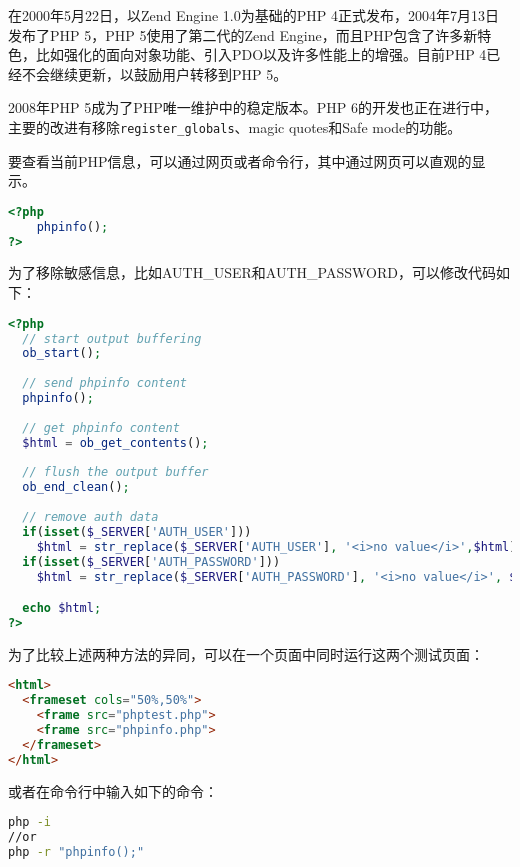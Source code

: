 在2000年5月22日，以Zend Engine 1.0为基础的PHP 4正式发布，2004年7月13日发布了PHP 5，PHP 5使用了第二代的Zend Engine，而且PHP包含了许多新特色，比如强化的面向对象功能、引入PDO以及许多性能上的增强。目前PHP 4已经不会继续更新，以鼓励用户转移到PHP 5。

2008年PHP 5成为了PHP唯一维护中的稳定版本。PHP 6的开发也正在进行中，主要的改进有移除\texttt{register\_globals}、magic quotes和Safe mode的功能。


要查看当前PHP信息，可以通过网页或者命令行，其中通过网页可以直观的显示。


\begin{lstlisting}[language=PHP]
<?php
	phpinfo();
?>
\end{lstlisting}


为了移除敏感信息，比如AUTH\_USER和AUTH\_PASSWORD，可以修改代码如下：

\begin{lstlisting}[language=PHP]
<?php
  // start output buffering
  ob_start();
  
  // send phpinfo content
  phpinfo();
  
  // get phpinfo content
  $html = ob_get_contents();
  
  // flush the output buffer
  ob_end_clean();
  
  // remove auth data
  if(isset($_SERVER['AUTH_USER']))
    $html = str_replace($_SERVER['AUTH_USER'], '<i>no value</i>',$html);
  if(isset($_SERVER['AUTH_PASSWORD']))
    $html = str_replace($_SERVER['AUTH_PASSWORD'], '<i>no value</i>', $html);

  echo $html;
?>
\end{lstlisting}

为了比较上述两种方法的异同，可以在一个页面中同时运行这两个测试页面：

\begin{lstlisting}[language=HTML]
<html>
  <frameset cols="50%,50%">
    <frame src="phptest.php">
    <frame src="phpinfo.php">
  </frameset>
</html>
\end{lstlisting}

或者在命令行中输入如下的命令：

\begin{lstlisting}[language=bash]
php -i
//or
php -r "phpinfo();"
\end{lstlisting}












